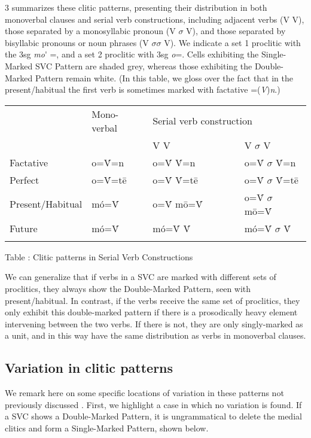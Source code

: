 \documentclass[output=paper]{langsci/langscibook}
\begin{document}
3 summarizes these clitic patterns, presenting their distribution in both monoverbal clauses and serial verb constructions, including adjacent verbs (V V), those separated by a monosyllabic pronoun (V $\sigma $ V), and those separated by bisyllabic pronouns or noun phrases (V $\sigma \sigma $ V). We indicate a set 1 proclitic with the 3sg \textit{mo}\'{} =, and a set 2 proclitic with 3sg \textit{o}=. Cells exhibiting the Single-Marked SVC Pattern are shaded grey, whereas those exhibiting the Double-Marked Pattern remain white. (In this table, we gloss over the fact that in the present/habitual the first verb is sometimes marked with factative =(\textit{V})\textit{n}.)

\begin{table}

\begin{tabularx}{\textwidth}{XXXXX}
\lsptoprule
\hhline{----~} & {Mono-}{verbal} & \multicolumn{2}{X}{{Serial verb construction}} & \\
\hhline{--~~~} &  & {V V} & \multicolumn{2}{X}{{V $\sigma $ V}}\\
{Factative} & {o=\'{V}=n} & {o=\'{V} \'{V}=n} & \multicolumn{2}{X}{{o=\'{V} $\sigma $ \'{V}=n}}\\
{Perfect} & {o=\'{V}=tē} & {o=\'{V} \'{V}=tē} & \multicolumn{2}{X}{{o=\'{V} $\sigma $ \'{V}=tē}}\\
{Present/Habitual} & {mó=\'{V}} & {o=\'{V} mō=\'{V}} & \multicolumn{2}{X}{{o=\'{V} $\sigma $ mō=\'{V}}}\\
{Future} & {mó=\'{V}} & {mó=\'{V} \'{V}} & \multicolumn{2}{X}{{mó=\'{V} $\sigma $ \'{V}}}\\
\lspbottomrule
\end{tabularx}
\label{bkm:Ref448125394}Table : Clitic patterns in Serial Verb Constructions
\end{table}



We can generalize that if verbs in a SVC are marked with different sets of proclitics, they always show the Double-Marked Pattern, seen with present/habitual. In contrast, if the verbs receive the same set of proclitics, they only exhibit this double-marked pattern if there is a prosodically heavy element intervening between the two verbs. If there is not, they are only singly-marked as a unit, and in this way have the same distribution as verbs in monoverbal clauses. 

\subsection{Variation in clitic patterns}
\label{bkm:Ref449531511}
We remark here on some specific locations of variation in these patterns not previously discussed \citep{Kari1997,Kari2003a,Kari2003b,Kari2004}. First, we highlight a case in which no variation is found. If a SVC shows a Double-Marked Pattern, it is ungrammatical to delete the medial clitics and form a Single-Marked Pattern, shown below.
\end{document}
